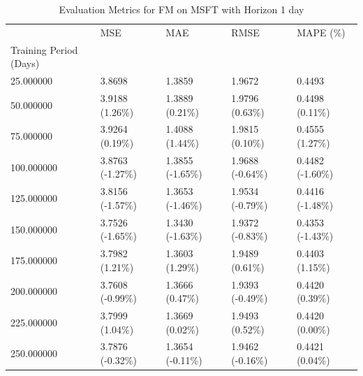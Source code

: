 \begin{table}
\caption{Evaluation Metrics for FM on MSFT with Horizon 1 day}
\label{tab:fm_MSFT_h1_metrics}
\begin{tabular}{lllll}
\toprule
 & MSE & MAE & RMSE & MAPE (\%) \\
Training Period (Days) &  &  &  &  \\
\midrule
25.000000 & 3.8698 & 1.3859 & 1.9672 & 0.4493 \\
50.000000 & 3.9188 (1.26\%) & 1.3889 (0.21\%) & 1.9796 (0.63\%) & 0.4498 (0.11\%) \\
75.000000 & 3.9264 (0.19\%) & 1.4088 (1.44\%) & 1.9815 (0.10\%) & 0.4555 (1.27\%) \\
100.000000 & 3.8763 (-1.27\%) & 1.3855 (-1.65\%) & 1.9688 (-0.64\%) & 0.4482 (-1.60\%) \\
125.000000 & 3.8156 (-1.57\%) & 1.3653 (-1.46\%) & 1.9534 (-0.79\%) & 0.4416 (-1.48\%) \\
150.000000 & 3.7526 (-1.65\%) & 1.3430 (-1.63\%) & 1.9372 (-0.83\%) & 0.4353 (-1.43\%) \\
175.000000 & 3.7982 (1.21\%) & 1.3603 (1.29\%) & 1.9489 (0.61\%) & 0.4403 (1.15\%) \\
200.000000 & 3.7608 (-0.99\%) & 1.3666 (0.47\%) & 1.9393 (-0.49\%) & 0.4420 (0.39\%) \\
225.000000 & 3.7999 (1.04\%) & 1.3669 (0.02\%) & 1.9493 (0.52\%) & 0.4420 (0.00\%) \\
250.000000 & 3.7876 (-0.32\%) & 1.3654 (-0.11\%) & 1.9462 (-0.16\%) & 0.4421 (0.04\%) \\
\bottomrule
\end{tabular}
\end{table}

